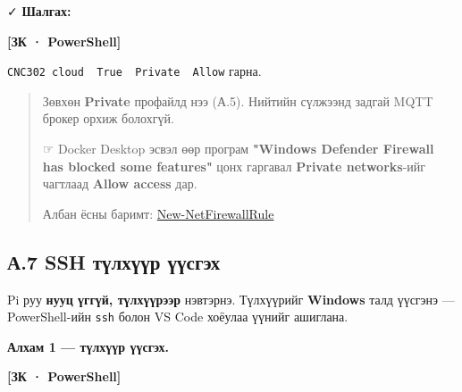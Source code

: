✓ \textbf{Шалгах:}

\textbf{{[}ЗК · PowerShell{]}}

\begin{Shaded}
\begin{Highlighting}[]
\NormalTok{ | }
\end{Highlighting}
\end{Shaded}

\texttt{CNC302\ cloud\ \ True\ \ Private\ \ Allow} гарна.

\begin{quote}
Зөвхөн \textbf{Private} профайлд нээ (А.5). Нийтийн сүлжээнд задгай MQTT брокер орхиж болохгүй.

☞ Docker Desktop эсвэл өөр програм \textbf{"Windows Defender Firewall has blocked some features"} цонх гаргавал \textbf{Private networks}-ийг чагтлаад \textbf{Allow access} дар.

Албан ёсны баримт: \href{https://learn.microsoft.com/en-us/powershell/module/netsecurity/new-netfirewallrule}{New-NetFirewallRule}
\end{quote}

\hypertarget{ux430.7-ssh-ux442ux4afux43bux445ux4afux4afux440-ux4afux4afux441ux433ux44dux445}{%
\subsection{А.7 SSH түлхүүр үүсгэх}\label{ux430.7-ssh-ux442ux4afux43bux445ux4afux4afux440-ux4afux4afux441ux433ux44dux445}}

Pi руу \textbf{нууц үггүй, түлхүүрээр} нэвтэрнэ. Түлхүүрийг \textbf{Windows} талд үүсгэнэ --- PowerShell-ийн \texttt{ssh} болон VS Code хоёулаа үүнийг ашиглана.

\textbf{Алхам 1 --- түлхүүр үүсгэх.}

\textbf{{[}ЗК · PowerShell{]}}

\begin{Shaded}
\begin{Highlighting}[]
\NormalTok{ | }
\end{Highlighting}
\end{Shaded}

